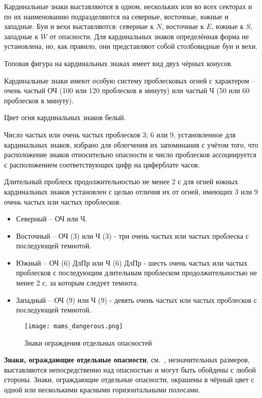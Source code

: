 Кардинальные знаки выставляются в одном, нескольких или во всех
секторах и по их наименованию подразделяются на северные, восточные,
южные и западные. Буи и вехи выставляются: северные к $N$, восточные к
$E$, южные к $S$, западные к $W$ от опасности.  Для кардинальных знаков
определённая форма не установлена, но, как правило, они представляют
собой столбовидные буи и вехи.

Топовая фигура на кардинальных знаках имеет вид двух чёрных конусов.

Кардинальные знаки имеют особую систему проблесковых огней с
характером \--- очень частый ОЧ (100 или 120 проблесков в минуту) или
частый Ч (50 или 60 проблесков в минуту).

Цвет огня кардинальных знаков белый.

Число частых или очень частых проблесков 3; 6 или 9, установленное для
кардинальных знаков, избрано для облегчения их запоминания с учётом
того, что расположение знаков относительно опасности и число
проблесков ассоциируется с расположением соответствующих цифр на
циферблате часов.

Длительный проблеск продолжительностью не менее 2 с для огней южных
кардинальных знаков установлен с целью отличия их от огней, имеющих 3
или 9 очень частых или частых проблесков.

\begin{itemize}
\item Северный \--- ОЧ или Ч.
\item Восточный \--- ОЧ (3) или Ч (3) - три очень частых или частых
  проблеска с последующей темнотой.
\item Южный \--- ОЧ (6) ДлПр или Ч (6) ДлПр - шесть очень частых или
  частых проблесков с последующим длительным проблеском
  продолжительностью не менее 2 с, за которым следует темнота.
\item Западный \--- ОЧ (9) или Ч (9) - девять очень частых или частых
  проблесков с последующей темнотой.
\end{itemize}

\begin{figure}[!htb]
  \centering{}
  \texttt{[image: mams\_dangerous.png]}
  \caption{Знаки ограждения отдельных опасностей}
  \label{fig:mams-dangerous}
\end{figure}

\textbf{Знаки, ограждающие отдельные опасности},
см.~, незначительных размеров, выставляются
непосредственно над опасностью и могут быть обойдены с любой
стороны. Знаки, ограждающие отдельные опасности, окрашены в чёрный
цвет с одной или несколькими красными горизонтальными полосами.

